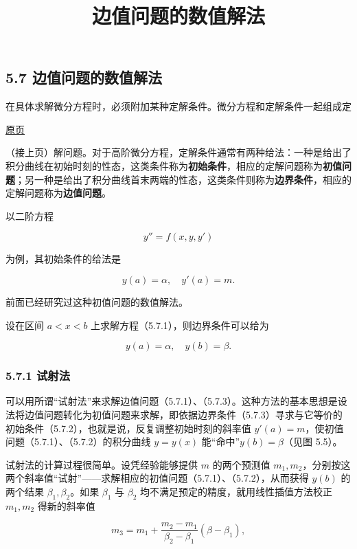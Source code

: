 \documentclass[
  10pt,
  fontset=fandol]{ctexart}
\title{边值问题的数值解法}
\author{}
\date{}
\begin{document}
\maketitle

\subsection{5.7 边值问题的数值解法}\label{ux8fb9ux503cux95eeux9898ux7684ux6570ux503cux89e3ux6cd5}

在具体求解微分方程时，必须附加某种定解条件。微分方程和定解条件一起组成定

\href{../../source-images/pdf-148.jpeg}{原页}

（接上页）解问题。对于高阶微分方程，定解条件通常有两种给法：一种是给出了积分曲线在初始时刻的性态，这类条件称为\textbf{初始条件}，相应的定解问题称为\textbf{初值问题}；另一种是给出了积分曲线首末两端的性态，这类条件则称为\textbf{边界条件}，相应的定解问题称为\textbf{边值问题}。

以二阶方程

\[
y''=f(x,y,y')
\tag{5.7.1}
\]

为例，其初始条件的给法是

\[
y(a)=\alpha,\quad y'(a)=m.
\tag{5.7.2}
\]

前面已经研究过这种初值问题的数值解法。

设在区间 \(a<x<b\) 上求解方程（5.7.1），则边界条件可以给为

\[
y(a)=\alpha,\quad y(b)=\beta.
\tag{5.7.3}
\]

\subsubsection{5.7.1 试射法}\label{ux8bd5ux5c04ux6cd5}

可以用所谓``试射法''来求解边值问题（5.7.1）、（5.7.3）。这种方法的基本思想是设法将边值问题转化为初值问题来求解，即依据边界条件（5.7.3）寻求与它等价的初始条件（5.7.2），也就是说，反复调整初始时刻的斜率值 \(y'(a)=m\)，使初值问题（5.7.1）、（5.7.2）的积分曲线 \(y=y(x)\) 能``命中''\(y(b)=\beta\)（见图 5.5）。

试射法的计算过程很简单。设凭经验能够提供 \(m\) 的两个预测值 \(m_1,m_2\)，分别按这两个斜率值``试射''------求解相应的初值问题（5.7.1）、（5.7.2），从而获得 \(y(b)\) 的两个结果 \(\beta_1,\beta_2\)。如果 \(\beta_1\) 与 \(\beta_2\) 均不满足预定的精度，就用线性插值方法校正 \(m_1,m_2\) 得新的斜率值

\[
m_3=m_1+\frac{m_2-m_1}{\beta_2-\beta_1}(\beta-\beta_1),
\]
\end{document}
